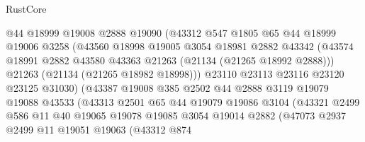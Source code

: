 \begin{lexlean}{RustCore}
\begin{coremodule}
                          @44
                          @18999
                          @19008
                          @2888
                          @19090
                          (@43312
                            @547
                            @1805
                            @65
                            @44
                            @18999
                            @19006
                            @3258
                            (@43560
                              @18998
                              @19005
                              @3054
                              @18981
                              @2882
                              @43342
                              (@43574
                                @18991
                                @2882
                                @43580
                                @43363
                                @21263
                                (@21134 (@21265 @18992 @2888)))
                              @21263
                              (@21134 (@21265 @18982 @18998)))
                            @23110
                            @23113
                            @23116
                            @23120
                            @23125
                            @31030)
                          (@43387
                            @19008
                            @385
                            @2502
                            @44
                            @2888
                            @3119
                            @19079
                            @19088
                            @43533
                            (@43313
                              @2501
                              @65
                              @44
                              @19079
                              @19086
                              @3104
                              (@43321
                                @2499
                                @586
                                @11
                                @40
                                @19065
                                @19078
                                @19085
                                @3054
                                @19014
                                @2882
                                (@47073
                                  @2937
                                  @2499
                                  @11
                                  @19051
                                  @19063
                                  (@43312
                                    @874

\end{coremodule}
\end{lexlean}

